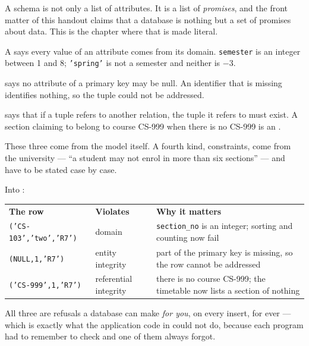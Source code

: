 A schema is not only a list of attributes. It is a list of \emph{promises}, and
the front matter of this handout claims that a database is nothing but a set
of promises about data. This is the chapter where that is made literal.

\begin{definitionbox}
A  says every value of an attribute comes from its
domain. \texttt{semester} is an integer between 1 and 8; \texttt{'spring'} is
not a semester and neither is $-3$.

\smallskip
{} says no attribute of a primary key may be null. An
identifier that is missing identifies nothing, so the tuple could not be
addressed.

\smallskip
{} says that if a tuple refers to another relation,
the tuple it refers to must exist. A section claiming to belong to course
CS-999 when there is no CS-999 is an .

\smallskip
These three come from the model itself. A fourth kind, 
constraints, come from the university --- ``a student may not enrol in more
than six sections'' --- and have to be stated case by case.
\end{definitionbox}

\begin{examplebox}
Into :

\medskip
\begin{tabular}{@{}L{4.4cm}L{3.2cm}L{5.8cm}@{}}
\textbf{The row} & \textbf{Violates} & \textbf{Why it matters} \\
\texttt{('CS-103','two','R7')} & domain & \texttt{section\_no} is an
  integer; sorting and counting now fail \\
\texttt{(NULL,1,'R7')} & entity integrity & part of the primary key is
  missing, so the row cannot be addressed \\
\texttt{('CS-999',1,'R7')} & referential integrity & there is no course
  CS-999; the timetable now lists a section of nothing \\
\end{tabular}

\smallskip
All three are refusals a database can make \emph{for you}, on every insert,
for ever --- which is exactly what the application code in
 could not do, because each program had to remember to
check and one of them always forgot.
\end{examplebox}

